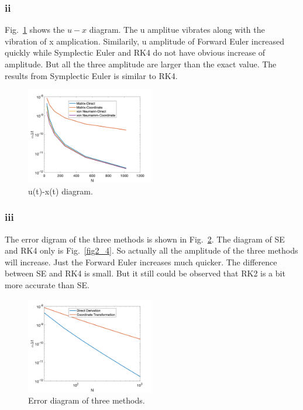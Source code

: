 \documentclass[letterpaper,10pt]{article}
\begin{document}
\subsubsection{ii}
Fig.~\ref{fig2_2} shows the $u-x$ diagram. The u amplitue vibrates along with the vibration of x amplication. Similarily, u amplitude of Forward Euler increased quickly while Symplectic Euler and RK4 do not have obvious increase of amplitude. But all the three amplitude are larger than the exact value. The results from Symplectic Euler is similar to RK4. 
\begin{figure}[h]
  \centering
  \includegraphics[width=0.5\textwidth]{p2_2.png}
  \caption{u(t)-x(t) diagram. }
  \label{fig2_2}
\end{figure}

\subsubsection{iii}
The error digram of the three methods is shown in Fig.~\ref{fig2_3}. The diagram of SE and RK4 only is Fig.~\ref{fig2_4}. So actually all the amplitude of the three methods will increase. Just the Forward Euler increases much quicker. The difference between SE and RK4 is small. But it still 
could be observed that RK2 is a bit more accurate than SE. 
\begin{figure}[h]
  \centering
  \includegraphics[width=0.5\textwidth]{p2_3.png}
  \caption{Error diagram of three methods. }
  \label{fig2_3}
\end{figure}
\end{document}
